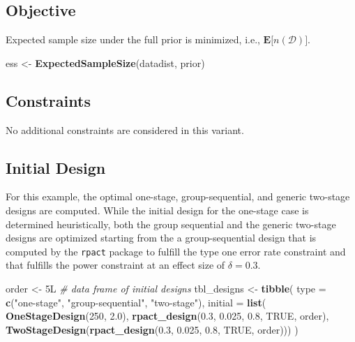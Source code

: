 \documentclass[]{book}
\newenvironment{Shaded}{\begin{snugshade}}{\end{snugshade}}
\newcommand{\CommentTok}[1]{\textcolor[rgb]{0.56,0.35,0.01}{\textit{#1}}}
\newcommand{\DataTypeTok}[1]{\textcolor[rgb]{0.13,0.29,0.53}{#1}}
\newcommand{\DecValTok}[1]{\textcolor[rgb]{0.00,0.00,0.81}{#1}}
\newcommand{\FloatTok}[1]{\textcolor[rgb]{0.00,0.00,0.81}{#1}}
\newcommand{\KeywordTok}[1]{\textcolor[rgb]{0.13,0.29,0.53}{\textbf{#1}}}
\newcommand{\NormalTok}[1]{#1}
\newcommand{\OtherTok}[1]{\textcolor[rgb]{0.56,0.35,0.01}{#1}}
\newcommand{\StringTok}[1]{\textcolor[rgb]{0.31,0.60,0.02}{#1}}
\begin{document}
\hypertarget{objective-3}{%
\subsection{Objective}\label{objective-3}}

Expected sample size under the full prior is minimized, i.e.,
\(\boldsymbol{E}\big[n(\mathcal{D})\big]\).

\begin{Shaded}
\begin{Highlighting}[]
\NormalTok{ess <-}\StringTok{ }\KeywordTok{ExpectedSampleSize}\NormalTok{(datadist, prior)}
\end{Highlighting}
\end{Shaded}

\hypertarget{constraints-3}{%
\subsection{Constraints}\label{constraints-3}}

No additional constraints are considered in this variant.

\hypertarget{initial-design-2}{%
\subsection{Initial Design}\label{initial-design-2}}

For this example, the optimal one-stage, group-sequential, and generic
two-stage designs are computed.
While the initial design for the one-stage case is determined heuristically,
both the group sequential and the generic two-stage designs are
optimized starting from the a group-sequential design that is computed by
the \texttt{rpact} package to fulfill the type one error rate constraint and
that fulfills the power constraint at an effect size of \(\delta = 0.3\).

\begin{Shaded}
\begin{Highlighting}[]
\NormalTok{order <-}\StringTok{ }\NormalTok{5L}
\CommentTok{# data frame of initial designs }
\NormalTok{tbl_designs <-}\StringTok{ }\KeywordTok{tibble}\NormalTok{(}
    \DataTypeTok{type    =} \KeywordTok{c}\NormalTok{(}\StringTok{"one-stage"}\NormalTok{, }\StringTok{"group-sequential"}\NormalTok{, }\StringTok{"two-stage"}\NormalTok{),}
    \DataTypeTok{initial =} \KeywordTok{list}\NormalTok{(}
        \KeywordTok{OneStageDesign}\NormalTok{(}\DecValTok{250}\NormalTok{, }\FloatTok{2.0}\NormalTok{),}
        \KeywordTok{rpact_design}\NormalTok{(}\FloatTok{0.3}\NormalTok{, }\FloatTok{0.025}\NormalTok{, }\FloatTok{0.8}\NormalTok{, }\OtherTok{TRUE}\NormalTok{, order),}
        \KeywordTok{TwoStageDesign}\NormalTok{(}\KeywordTok{rpact_design}\NormalTok{(}\FloatTok{0.3}\NormalTok{, }\FloatTok{0.025}\NormalTok{, }\FloatTok{0.8}\NormalTok{, }\OtherTok{TRUE}\NormalTok{, order))) )}
\end{Highlighting}
\end{Shaded}
\end{document}

